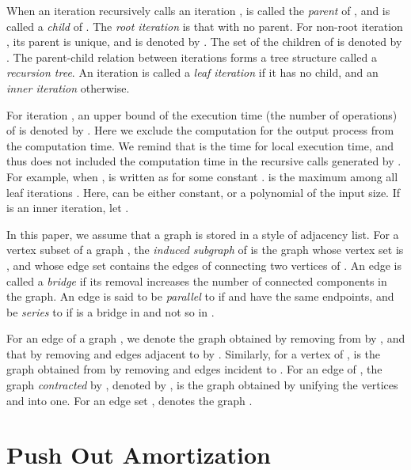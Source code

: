 \documentclass{llncs}
\begin{document}
When an iteration  recursively calls an iteration ,  is called 
the {\em parent} of , and  is called a {\em child} of .
The {\em root iteration} is that with no parent.
For non-root iteration , its parent is unique, and is denoted by .
The set of the children of  is denoted by .
The parent-child relation between iterations forms a tree structure
 called a {\em recursion tree}.
An iteration is called a {\em leaf iteration} if it has no child, and 
 an {\em inner iteration} otherwise.

For iteration , an upper bound of the
 execution time (the number of operations) of  is denoted by .
Here we exclude the computation for the output process from the
 computation time.
We remind that  is the time for local execution time, and thus does
 not included the computation time in the recursive calls generated by .
For example, when ,  is written as  for some 
 constant .
 is the maximum  among all leaf iterations .
Here,  can be either constant, or a polynomial of the input size.
If  is an inner iteration, let .

In this paper, we assume that a graph is stored in a style of adjacency list.
For a vertex subset  of a graph , the {\em induced
 subgraph} of  is the graph whose vertex set is , and whose edge
 set contains the edges of  connecting two vertices of .
An edge is called a {\em bridge} if its removal increases the number
 of connected components in the graph.
An edge  is said to be {\em parallel} to  if  and  have the same
 endpoints, and be {\em series} to 
  if  is a bridge in  and not so in .

For an edge  of a graph , we denote the graph obtained by removing
  from  by , and that by removing  and edges adjacent
 to  by .
Similarly, for a vertex  of ,  is the graph obtained 
 from  by removing  and edges incident to .
For an edge  of , the graph {\em contracted} by , denoted 
 by , is the graph obtained by unifying
  the vertices  and  into one.
For an edge set ,  denotes the graph 
 .

\vspace{-2mm}
\section{Push Out Amortization}\label{sec:PO}
\vspace{-2mm}
\end{document}
